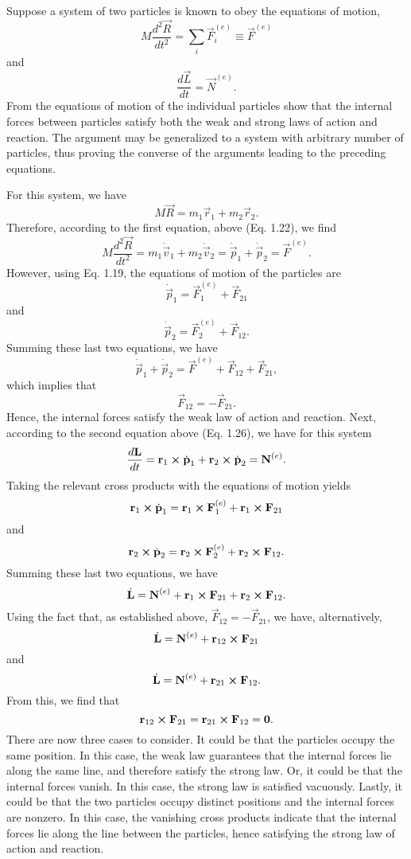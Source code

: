 \begin{questions}
\question Suppose a system of two particles is known to obey the equations of motion, 
\[
M \frac{d^2 \vec{R}}{dt^2} = \sum_i \vec{F}_i^{(e)} \equiv \vec{F}^{(e)}
\]
and
\[
\frac{d \vec{L}}{dt} = \vec{N}^{(e)}.
\]
From the equations of motion of the individual particles show that the internal forces between particles satisfy both the weak and strong laws of action and reaction. The argument may be generalized to a system with arbitrary number of particles, thus proving the converse of the arguments leading to the preceding equations.
\begin{solution}
For this system, we have
\[
M \vec{R} = m_1 \vec{r}_1 + m_2 \vec{r}_2.
\]
Therefore, according to the first equation, above (Eq. 1.22), we find
\[
M \frac{d^2 \vec{R}}{dt^2} = m_1 \dot{\vec{v}}_1 + m_2 \dot{\vec{v}}_2 = \dot{\vec{p}}_1 + \dot{\vec{p}}_2 = \vec{F}^{(e)}.
\]
However, using Eq. 1.19, the equations of motion of the particles are
\[
\dot{\vec{p}}_1 = \vec{F}_1^{(e)} + \vec{F}_{21}
\]
and
\[
\dot{\vec{p}}_2 = \vec{F}_2^{(e)} + \vec{F}_{12}.
\]
Summing these last two equations, we have
\[
\dot{\vec{p}}_1 + \dot{\vec{p}}_2 = \vec{F}^{(e)} + \vec{F}_{12} + \vec{F}_{21},
\]
which implies that
\[
\vec{F}_{12} = -\vec{F}_{21}.
\]
Hence, the internal forces satisfy the weak law of action and reaction. Next, according to the second equation above (Eq. 1.26), we have for this system
\[
\frac{d \bm{\mathbf{L}}}{dt} = \bm{\mathbf{r}}_1 \boldsymbol{\times} \dot{\bm{\mathbf{p}}}_1 + \bm{\mathbf{r}}_2 \boldsymbol{\times} \dot{\bm{\mathbf{p}}}_2 = \bm{\mathbf{N}}^{(e)}.
\]
Taking the relevant cross products with the equations of motion yields
\[
\bm{\mathbf{r}}_1 \boldsymbol{\times} \dot{\bm{\mathbf{p}}}_1 = \bm{\mathbf{r}}_1 \boldsymbol{\times} \bm{\mathbf{F}}_1^{(e)} + \bm{\mathbf{r}}_1 \boldsymbol{\times} \bm{\mathbf{F}}_{21}
\]
and
\[
\bm{\mathbf{r}}_2 \boldsymbol{\times} \dot{\bm{\mathbf{p}}}_2 = \bm{\mathbf{r}}_2 \boldsymbol{\times} \bm{\mathbf{F}}_2^{(e)} + \bm{\mathbf{r}}_2 \boldsymbol{\times} \bm{\mathbf{F}}_{12}.
\]
Summing these last two equations, we have
\[
\dot{\bm{\mathbf{L}}} = \bm{\mathbf{N}}^{(e)} + \bm{\mathbf{r}}_1 \boldsymbol{\times} \bm{\mathbf{F}}_{21} + \bm{\mathbf{r}}_2 \boldsymbol{\times} \bm{\mathbf{F}}_{12}.
\]
Using the fact that, as established above, $\vec{F}_{12} = -\vec{F}_{21}$, we have, alternatively,
\[
\dot{\bm{\mathbf{L}}} = \bm{\mathbf{N}}^{(e)} + \bm{\mathbf{r}}_{12} \boldsymbol{\times} \bm{\mathbf{F}}_{21}
\]
and
\[
\dot{\bm{\mathbf{L}}} = \bm{\mathbf{N}}^{(e)} + \bm{\mathbf{r}}_{21} \boldsymbol{\times} \bm{\mathbf{F}}_{12}.
\]
From this, we find that
\[
\bm{\mathbf{r}}_{12} \boldsymbol{\times} \bm{\mathbf{F}}_{21} = \bm{\mathbf{r}}_{21} \boldsymbol{\times} \bm{\mathbf{F}}_{12} = \bm{\mathbf{0}}.
\]
There are now three cases to consider. It could be that the particles occupy the same position. In this case, the weak law guarantees that the internal forces lie along the same line, and therefore satisfy the strong law. Or, it could be that the internal forces vanish. In this case, the strong law is satisfied vacuously. Lastly, it could be that the two particles occupy distinct positions and the internal forces are nonzero. In this case, the vanishing cross products indicate that the internal forces lie along the line between the particles, hence satisfying the strong law of action and reaction. 
\end{solution}


\end{questions}
